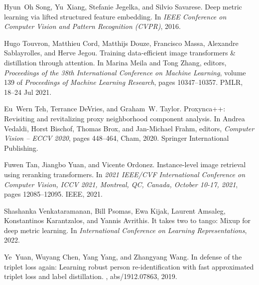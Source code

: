 \documentclass{article}
\begin{document}
\begin{thebibliography}{YCYW19}
Hyun~Oh Song, Yu~Xiang, Stefanie Jegelka, and Silvio Savarese.
\newblock Deep metric learning via lifted structured feature embedding.
\newblock In {\em IEEE Conference on Computer Vision and Pattern Recognition
  (CVPR)}, 2016.

Hugo Touvron, Matthieu Cord, Matthijs Douze, Francisco Massa, Alexandre
  Sablayrolles, and Herve Jegou.
\newblock Training data-efficient image transformers \& distillation through
  attention.
\newblock In Marina Meila and Tong Zhang, editors, {\em Proceedings of the 38th
  International Conference on Machine Learning}, volume 139 of {\em Proceedings
  of Machine Learning Research}, pages 10347--10357. PMLR, 18--24 Jul 2021.

Eu~Wern Teh, Terrance DeVries, and Graham~W. Taylor.
\newblock Proxynca++: Revisiting and revitalizing proxy neighborhood component
  analysis.
\newblock In Andrea Vedaldi, Horst Bischof, Thomas Brox, and Jan-Michael Frahm,
  editors, {\em Computer Vision -- ECCV 2020}, pages 448--464, Cham, 2020.
  Springer International Publishing.

Fuwen Tan, Jiangbo Yuan, and Vicente Ordonez.
\newblock Instance-level image retrieval using reranking transformers.
\newblock In {\em 2021 {IEEE/CVF} International Conference on Computer Vision,
  {ICCV} 2021, Montreal, QC, Canada, October 10-17, 2021}, pages 12085--12095.
  {IEEE}, 2021.

Shashanka Venkataramanan, Bill Psomas, Ewa Kijak, Laurent Amsaleg, Konstantinos
  Karantzalos, and Yannis Avrithis.
\newblock It takes two to tango: Mixup for deep metric learning.
\newblock In {\em International Conference on Learning Representations}, 2022.

Ye~Yuan, Wuyang Chen, Yang Yang, and Zhangyang Wang.
\newblock In defense of the triplet loss again: Learning robust person
  re-identification with fast approximated triplet loss and label distillation.
, abs/1912.07863, 2019.

\end{thebibliography}
\end{document}
